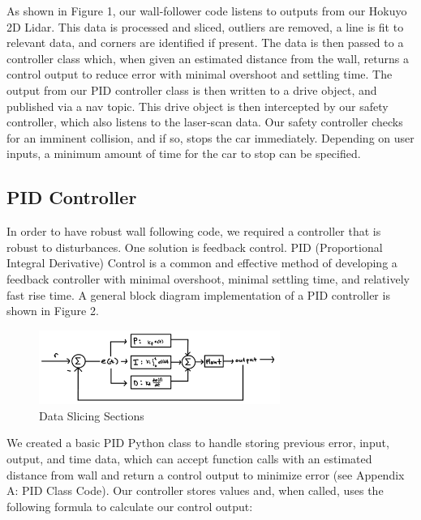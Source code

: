 \documentclass{article}
\begin{document}
As shown in Figure 1, our wall-follower code listens to outputs from our Hokuyo 2D Lidar. This data is processed and sliced, outliers are removed, a line is fit to relevant data, and corners are identified if present. The data is then passed to a controller class which, when given an estimated distance from the wall, returns a control output to reduce error with minimal overshoot and settling time. The output from our PID controller class is then written to a drive object, and published via a nav topic. This drive object is then intercepted by our safety controller, which also listens to the laser-scan data. Our safety controller checks for an imminent collision, and if so, stops the car immediately. Depending on user inputs, a minimum amount of time for the car to stop can be specified. \\




\subsection{PID Controller}
In order to have robust wall following code, we required a controller that is robust to disturbances. One solution is feedback control. PID (Proportional Integral Derivative) Control is a common and effective method of developing a feedback controller with minimal overshoot, minimal settling time, and relatively fast rise time. A general block diagram implementation of a PID controller is shown in Figure 2. 

\begin{figure}[h]
\begin{center}
\includegraphics[width=0.7\textwidth]{pidblockdig.png} %
\caption{Data Slicing Sections}
\end{center}
\label{workflow}
\end{figure}

We created a basic PID Python class to handle storing previous error, input, output, and time data, which can accept function calls with an estimated distance from wall and return a control output to minimize error (see Appendix A: PID Class Code). Our controller stores values and, when called, uses the following formula to calculate our control output:
\end{document}
